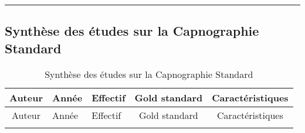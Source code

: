\documentclass[12pt,]{article}
\begin{document}
\newpage
\begin{landscape}

\begin{center}\rule{0.5\linewidth}{0.5pt}\end{center}

\hypertarget{synthuxe8se-des-uxe9tudes-sur-la-capnographie-standard-3}{%
\subsection{Synthèse des études sur la Capnographie
Standard}\label{synthuxe8se-des-uxe9tudes-sur-la-capnographie-standard-3}}

\begin{longtable}[]{@{}cllcc@{}}
\caption{Synthèse des études sur la Capnographie
Standard}\tabularnewline
\toprule
\begin{minipage}[b]{0.31\columnwidth}\centering
Auteur\strut
\end{minipage} & \begin{minipage}[b]{0.05\columnwidth}\raggedright
Année\strut
\end{minipage} & \begin{minipage}[b]{0.06\columnwidth}\raggedright
Effectif\strut
\end{minipage} & \begin{minipage}[b]{0.12\columnwidth}\centering
Gold standard\strut
\end{minipage} & \begin{minipage}[b]{0.32\columnwidth}\centering
Caractéristiques\strut
\end{minipage}\tabularnewline
\midrule
\endfirsthead
\toprule
\begin{minipage}[b]{0.31\columnwidth}\centering
Auteur\strut
\end{minipage} & \begin{minipage}[b]{0.05\columnwidth}\raggedright
Année\strut
\end{minipage} & \begin{minipage}[b]{0.06\columnwidth}\raggedright
Effectif\strut
\end{minipage} & \begin{minipage}[b]{0.12\columnwidth}\centering
Gold standard\strut
\end{minipage} & \begin{minipage}[b]{0.32\columnwidth}\centering
Caractéristiques\strut
\end{minipage}\tabularnewline
\midrule
\endhead
\begin{minipage}[t]{0.31\columnwidth}\centering

\end{minipage}
\end{longtable}
\end{landscape}
\end{document}
